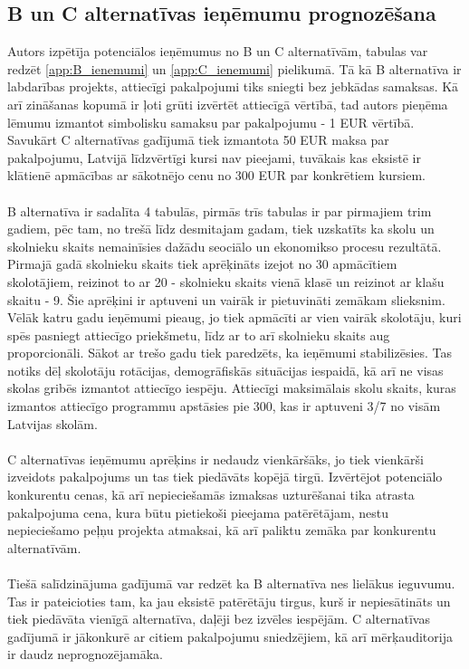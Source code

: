 \subsection{B un C alternatīvas ieņēmumu prognozēšana}
Autors izpētīja potenciālos ieņēmumus no B un C alternatīvām, tabulas var redzēt \ref{app:B_ienemumi} un \ref{app:C_ienemumi} pielikumā.
Tā kā B alternatīva ir labdarības projekts, attiecīgi pakalpojumi tiks sniegti bez jebkādas samaksas. Kā arī zināšanas kopumā
ir ļoti grūti izvērtēt attiecīgā vērtībā, tad autors pieņēma lēmumu izmantot simbolisku samaksu par pakalpojumu - 1 EUR vērtībā.
Savukārt C alternatīvas gadījumā tiek izmantota 50 EUR maksa par pakalpojumu, Latvijā līdzvērtīgi kursi nav pieejami, tuvākais kas
eksistē ir klātienē apmācības ar sākotnējo cenu no 300 EUR par konkrētiem kursiem.
\paragraph{}
B alternatīva ir sadalīta 4 tabulās, pirmās trīs tabulas ir par pirmajiem trim gadiem, pēc tam, no trešā līdz desmitajam gadam,
tiek uzskatīts ka skolu un skolnieku skaits nemainīsies dažādu seociālo un ekonomikso procesu rezultātā. Pirmajā gadā skolnieku skaits
tiek aprēķināts izejot no 30 apmācītiem skolotājiem, reizinot to ar 20 - skolnieku skaits vienā klasē un reizinot ar klašu skaitu - 9.
Šie aprēķini ir aptuveni un vairāk ir pietuvināti zemākam slieksnim. Vēlāk katru gadu ieņēmumi pieaug, jo tiek apmācīti ar vien vairāk
skolotāju, kuri spēs pasniegt attiecīgo priekšmetu, līdz ar to arī skolnieku skaits aug proporcionāli. Sākot ar trešo gadu tiek paredzēts,
ka ieņēmumi stabilizēsies. Tas notiks dēļ skolotāju rotācijas, demogrāfiskās situācijas iespaidā, kā arī ne visas skolas gribēs izmantot
attiecīgo iespēju. Attiecīgi maksimālais skolu skaits, kuras izmantos attiecīgo programmu apstāsies pie 300, kas ir aptuveni 3/7 no visām
Latvijas skolām.
\paragraph{}
C alternatīvas ieņēmumu aprēķins ir nedaudz vienkāršāks, jo tiek vienkārši izveidots pakalpojums un tas tiek piedāvāts kopējā tirgū.
Izvērtējot potenciālo konkurentu cenas, kā arī nepieciešamās izmaksas uzturēšanai tika atrasta pakalpojuma cena, kura būtu pietiekoši
pieejama patērētājam, nestu nepieciešamo peļņu projekta atmaksai, kā arī paliktu zemāka par konkurentu alternatīvām.
\paragraph{}
Tiešā salīdzinājuma gadījumā var redzēt ka B alternatīva nes lielākus ieguvumu. Tas ir pateicioties tam, ka jau eksistē patērētāju tirgus,
kurš ir nepiesātināts un tiek piedāvāta vienīgā alternatīva, daļēji bez izvēles iespējām. C alternatīvas gadījumā ir jākonkurē ar citiem
pakalpojumu sniedzējiem, kā arī mērķauditorija ir daudz neprognozējamāka.
